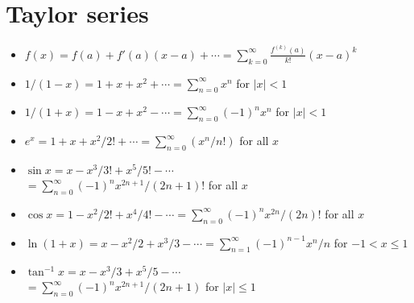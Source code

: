 \documentclass{slnotes}
\begin{document}
\section{Taylor series}
\begin{itemize}
\item \(f(x) = f(a) + f'(a)(x-a) + \cdots = \sum^\infty_{k=0}\frac{f^{(k)}(a)}{k!}(x-a)^k\)
\item \(1/(1-x) = 1 + x + x^2 + \cdots  = \sum^\infty_{n=0}x^n\) for \(\lvert x\rvert<1\)
\item \(1/(1+x) = 1 - x + x^2 - \cdots = \sum^\infty_{n=0}(-1)^nx^n\) for \(\lvert x\rvert<1\)
\item \(e^x = 1 + x + x^2/2! + \cdots = \sum^\infty_{n=0}(x^n/n!)\) for all \(x\)
\item \(\sin x = x - x^3/3! + x^5/5! - \cdots\)\\\(= \sum^\infty_{n=0} (-1)^n x^{2n+1} / (2n+1)!\) for all \(x\)
\item \(\cos x = 1 - x^2/2! + x^4/4! - \cdots = \sum^\infty_{n=0}(-1)^nx^{2n}/(2n)!\) for all \(x\)
\item \(\ln(1+x) = x - x^2/2 + x^3/3 - \cdots = \sum^\infty_{n=1}(-1)^{n-1}x^n/n\) for \(-1 < x \le 1\)
\item \(\tan^{-1}x = x - x^3/3 + x^5/5 - \cdots\)\\\(= \sum^\infty_{n=0} (-1)^n x^{2n+1} / (2n+1)\) for \(\lvert x\rvert\le1\)
\end{itemize}
\end{document}
